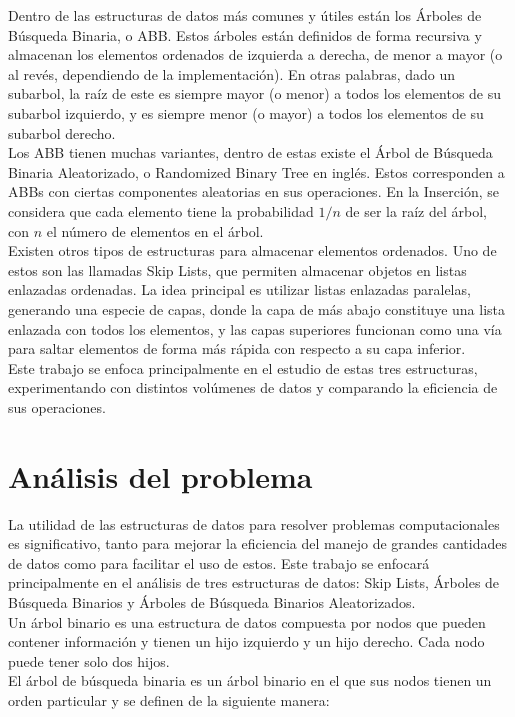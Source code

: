 \documentclass[11pt,letterpaper]{article}
\begin{document}
Dentro de las estructuras de datos más comunes y útiles están los Árboles de Búsqueda Binaria, o ABB. Estos árboles están definidos de forma recursiva y almacenan los elementos ordenados de izquierda a derecha, de menor a mayor (o al revés, dependiendo de la implementación). En otras palabras, dado un subarbol, la raíz de este es siempre mayor (o menor) a todos los elementos de su subarbol izquierdo, y es siempre menor (o mayor) a todos los elementos de su subarbol derecho.\\

Los ABB tienen muchas variantes, dentro de estas existe el Árbol de Búsqueda Binaria Aleatorizado, o Randomized Binary Tree en inglés. Estos corresponden a ABBs con ciertas componentes aleatorias en sus operaciones. En la Inserción, se considera que cada elemento tiene la probabilidad $1/n$ de ser la raíz del árbol, con $n$ el número de elementos en el árbol.\\

Existen otros tipos de estructuras para almacenar elementos ordenados. Uno de estos son las llamadas Skip Lists, que permiten almacenar objetos en listas enlazadas ordenadas. La idea principal es utilizar listas enlazadas paralelas, generando una especie de capas, donde la capa de más abajo constituye una lista enlazada con todos los elementos, y las capas superiores funcionan como una vía para saltar elementos de forma más rápida con respecto a su capa inferior.\\

Este trabajo se enfoca principalmente en el estudio de estas tres estructuras, experimentando con distintos volúmenes de datos y comparando la eficiencia de sus operaciones.

\newpage
\section{Análisis del problema}

La utilidad de las estructuras de datos para resolver problemas computacionales es significativo, tanto para mejorar la eficiencia del manejo de grandes cantidades de datos como para facilitar el uso de estos. Este trabajo se enfocará principalmente en el análisis de tres estructuras de datos: Skip Lists, Árboles de Búsqueda Binarios y Árboles de Búsqueda Binarios Aleatorizados.\\

Un árbol binario es una estructura de datos compuesta por nodos que pueden contener información y tienen un hijo izquierdo y un hijo derecho. Cada nodo puede tener solo dos hijos.\\
El árbol de búsqueda binaria es un árbol binario en el que sus nodos tienen un orden particular y se definen de la siguiente manera:\\
\end{document}
